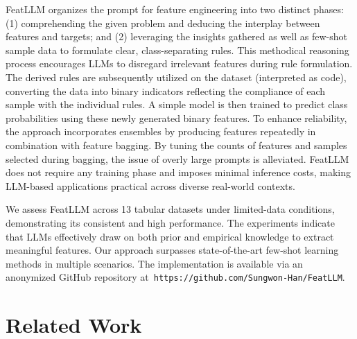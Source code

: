\textsf{FeatLLM} organizes the prompt for feature engineering into two distinct phases: (1) comprehending the given problem and deducing the interplay between features and targets; and (2) leveraging the insights gathered as well as few-shot sample data to formulate clear, class-separating rules. This methodical reasoning process encourages LLMs to disregard irrelevant features during rule formulation. The derived rules are subsequently utilized on the dataset (interpreted as code), converting the data into binary indicators reflecting the compliance of each sample with the individual rules. A simple model is then trained to predict class probabilities using these newly generated binary features. To enhance reliability, the approach incorporates ensembles by producing features repeatedly in combination with feature bagging. By tuning the counts of features and samples selected during bagging, the issue of overly large prompts is alleviated. \textsf{FeatLLM} does not require any training phase and imposes minimal inference costs, making LLM-based applications practical across diverse real-world contexts.

We assess \textsf{FeatLLM} across 13 tabular datasets under limited-data conditions, demonstrating its consistent and high performance. The experiments indicate that LLMs effectively draw on both prior and empirical knowledge to extract meaningful features. Our approach surpasses state-of-the-art few-shot learning methods in multiple scenarios. The implementation is available via an anonymized GitHub repository at~\texttt{https://github.com/Sungwon-Han/FeatLLM}.

\section{Related Work}

